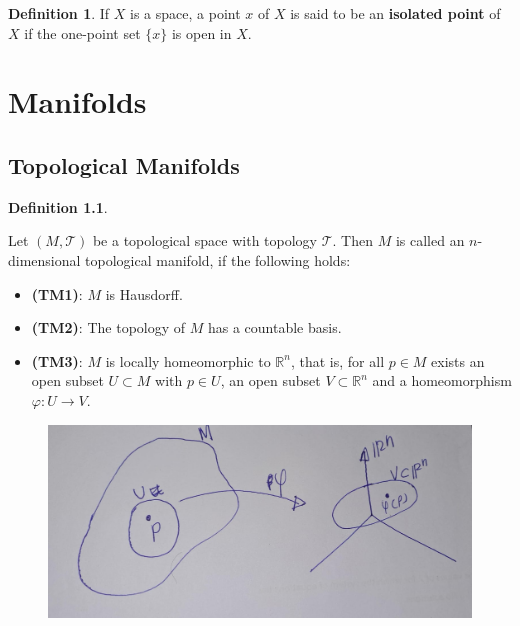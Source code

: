 \documentclass[
]{book}
\providecommand{\tightlist}{%
  \setlength{\itemsep}{0pt}\setlength{\parskip}{0pt}}
\theoremstyle{definition}
\newtheorem{definition}{Definition}[chapter]
\theoremstyle{definition}
\theoremstyle{definition}
\theoremstyle{definition}
\theoremstyle{remark}
\begin{document}
\begin{definition}
\protect\hypertarget{def:unnamed-chunk-6}{}\label{def:unnamed-chunk-6}If \(X\) is a space, a point \(x\) of \(X\) is said to be an \textbf{isolated point} of \(X\) if the one-point set \(\{x\}\) is open in \(X\).
\end{definition}

\hypertarget{manifolds}{%
\chapter{Manifolds}\label{manifolds}}

\hypertarget{topological-manifolds}{%
\section{Topological Manifolds}\label{topological-manifolds}}

\begin{definition}
\protect\hypertarget{def:topmanifold}{}\label{def:topmanifold}

Let \((M,\mathcal{T})\) be a topological space with topology \(\mathcal{T}\). Then \(M\) is called an \(n\)-dimensional topological manifold, if the following holds:

\begin{itemize}
\tightlist
\item
  \textbf{(TM1)}: \(M\) is Hausdorff.
\item
  \textbf{(TM2)}: The topology of \(M\) has a countable basis.
\item
  \textbf{(TM3)}: \(M\) is locally homeomorphic to \(\mathbb{R}^n\), that is, for all \(p \in M\) exists an open subset \(U \subset M\) with \(p \in U\), an open subset \(V \subset \mathbb{R}^n\) and a homeomorphism \(\varphi : U \rightarrow V\).
\end{itemize}

\end{definition}

\begin{figure}
\centering
\includegraphics{figures/ch1/fig02.jpg}
\caption{\label{fig:fig02}\(~\)}
\end{figure}
\end{document}
